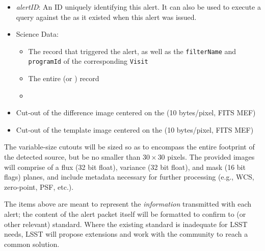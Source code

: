 \documentclass[SE,lsstdraft,toc]{lsstdoc}
\begin{document}
\begin{itemize}
    \item \emph{alertID}: An ID uniquely identifying this alert. It can also be used to execute a query against the \DB as it existed when this alert was issued.
    \item Science Data:
    \begin{itemize}
        \item The \DIASource record that triggered the alert, as well as the \texttt{filterName} and \texttt{programId} of the corresponding \texttt{Visit}
	\item The entire \DIAObject (or \SSObject) record
	\item {}  
    \end{itemize}
    \item Cut-out of the difference image centered on the \DIASource (10 bytes/pixel, FITS MEF)
    \item Cut-out of the template image centered on the \DIASource (10 bytes/pixel, FITS MEF)
\end{itemize}

The variable-size cutouts will be sized so as to encompass the entire footprint of the detected source, but be no smaller than $30 \times 30$ pixels. The provided images will comprise of a flux (32 bit float), variance (32 bit float), and mask (16 bit flags) planes, and include metadata necessary for further processing (e.g., WCS, zero-point, PSF, etc.).

The items above are meant to represent the \emph{information} transmitted with each alert; the content of the alert packet itself will be formatted to confirm to \VOEvent (or other relevant) standard. Where the existing standard is inadequate for LSST needs, LSST will propose extensions and work with the community to reach a common solution.
\end{document}
